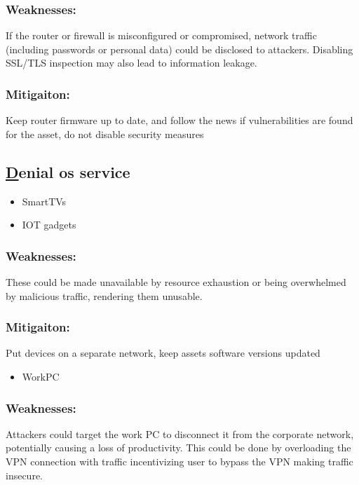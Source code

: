 \documentclass[
	letterpaper, %
	10pt, %
	unnumberedsections, %
	twoside, %
]{APAAssignment}
\begin{document}
\begin{singlespace}
	\subsubsection{Weaknesses:} If the router or firewall is misconfigured or compromised, network traffic (including passwords or personal data) could be disclosed to attackers. Disabling SSL/TLS inspection may also lead to information leakage.
	\subsubsection{Mitigaiton:} Keep router firmware up to date, and follow the news if vulnerabilities are found for the asset, do not disable security measures
	
	
\end{singlespace}

\begin{singlespace}
\subsection{\underline{D}enial os service}


	\begin{itemize}
		\item SmartTVs
		\item IOT gadgets 
	\end{itemize}
	
	\subsubsection{Weaknesses:} These could be made unavailable by resource exhaustion or being overwhelmed by malicious traffic, rendering them unusable.
	\subsubsection{Mitigaiton:} Put devices on a separate network, keep assets software versions updated
	
	\begin{itemize}
		\item WorkPC
	\end{itemize}
	
	\subsubsection{Weaknesses:} Attackers could target the work PC to disconnect it from the corporate network, potentially causing a loss of productivity. This could be done by overloading the VPN connection with traffic incentivizing user to bypass the VPN making traffic insecure.

\end{singlespace}
\end{document}
